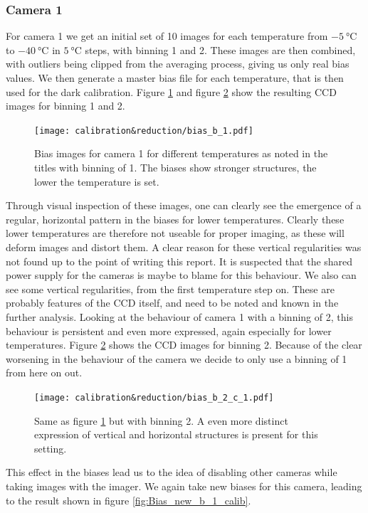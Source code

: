 \documentclass{article}
\begin{document}
\subsubsection{Camera 1}
For camera 1 we get an initial set of 10 images for each temperature from $\SI{-5}{\celsius}$ to $\SI{-40}{\celsius}$ in $\SI{5}{\celsius}$ steps, with binning 1 and 2. These images are then combined, with outliers being clipped from the averaging process, giving us only real bias values. We then generate a master bias file for each temperature, that is then used for the dark calibration. Figure \ref{fig:Bias_old_b_1_calib} and figure \ref{fig:Bias_old_b_2_calib} show the resulting CCD images for binning 1 and 2.
\begin{figure}[H]
    \centering
    \texttt{[image: calibration\&reduction/bias\_b\_1.pdf]}
    \caption{Bias images for camera 1 for different temperatures as noted in the titles with binning of 1. The biases show stronger structures, the lower the temperature is set.}
    \label{fig:Bias_old_b_1_calib}
\end{figure}
Through visual inspection of these images, one can clearly see the emergence of a regular, horizontal pattern in the biases for lower temperatures. Clearly these lower temperatures are therefore not useable for proper imaging, as these will deform images and distort them. A clear reason for these vertical regularities was not found up to the point of writing this report. It is suspected that the shared power supply for the cameras is maybe to blame for this behaviour. We also can see some vertical regularities, from the first temperature step on. These are probably features of the CCD itself, and need to be noted and known in the further analysis. Looking at the behaviour of camera 1 with a binning of 2, this behaviour is persistent and even more expressed, again especially for lower temperatures. Figure \ref{fig:Bias_old_b_2_calib} shows the CCD images for binning 2. Because of the clear worsening in the behaviour of the camera we decide to only use a binning of 1 from here on out.
\begin{figure}[H]
    \centering
    \texttt{[image: calibration\&reduction/bias\_b\_2\_c\_1.pdf]}
    \caption{Same as figure \ref{fig:Bias_old_b_1_calib} but with binning 2. A even more distinct expression of vertical and horizontal structures is present for this setting.}
    \label{fig:Bias_old_b_2_calib}
\end{figure}
This effect in the biases lead us to the idea of disabling other cameras while taking images with the imager. We again take new biases for this camera, leading to the result shown in figure \ref{fig:Bias_new_b_1_calib}.
\end{document}
